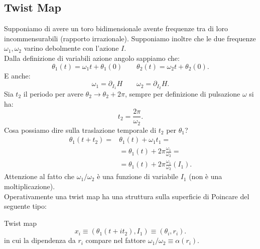\subsection{Twist Map}%
\label{sub:Twist Map}
Supponiamo di avere un toro bidimensionale avente frequenze tra di loro incommensurabili (rapporto irrazionale). Supponiamo inoltre che le due frequenze $\omega_1, \omega_2$ varino debolmente con l'azione $I$.\\
Dalla definizione di variabili azione angolo sappiamo che:
\[
    \theta_1(t)=\omega_1t+\theta_1(0) \qquad
    \theta_2(t)=\omega_2t+\theta_2(0)
.\] 
E anche:
\[
    \omega_1 = \partial_{I_1}H \qquad \omega_2 = \partial_{I_2}H
.\] 
Sia $t_2$  il periodo per avere $\theta_2\to \theta_2+2\pi$, sempre per definizione di pulsazione $\omega$ si ha:
\[
    t_2 =  \frac{2\pi}{\omega_2}
.\] 
Cosa possiamo dire sulla traslazione temporale di $t_2$  per $\theta_1$?
\[\begin{aligned}
    \theta_1(t+t_2) =& \theta_1(t)+\omega_1t_1 = \\
		     & = \theta_1(t) + 2\pi\frac{\omega_1}{\omega_2} = \\
		     & =\theta_1(t) + 2\pi  \frac{\omega_1}{\omega_2}(I_1)
.\end{aligned}\]
Attenzione al fatto che $\omega_1/\omega_2$ è una funzione di variabile $I_1$ (non è una moltiplicazione).\\
Operativamente una twist map ha una struttura sulla superficie di Poincare del seguente tipo:
\begin{redbox}{Twist map}
    \[
	x_i \equiv \left(\theta_1(t+it_2), I_1\right) \equiv (\theta_i, r_i)
    .\] 
    in cui la dipendenza da $r_i$ compare nel fattore $\omega_1 /\omega_2 \equiv \alpha (r_i)$.
\end{redbox}
\noindent
